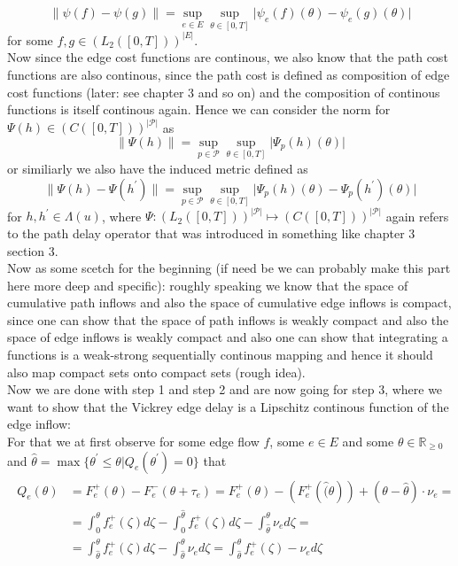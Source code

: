 \documentclass[reqno,openany]{amsbook}
\theoremstyle{definition}
\theoremstyle{plain}
\begin{document}
\[ \lVert \psi(f) - \psi(g) \rVert = \sup_{e \in E} \sup_{\theta \in [0, T]} \lvert \psi_e(f)(\theta) - \psi_e(g)(\theta) \rvert \]
for some $f, g \in (L_2([0,T]))^{\lvert E \rvert}$. \\
Now since the edge cost functions are continous, we also know that the path cost functions are also continous, since the path cost is defined as composition of edge cost functions (later: see chapter 3 and so on) and the composition of continous functions is itself continous again. Hence we can consider the norm for $\Psi(h) \in (C([0, T]))^{\lvert \mathcal{P} \rvert}$ as
\[ \lVert \Psi(h) \rVert = \sup_{p \in \mathcal{P}} \sup_{\theta \in [0, T]} \lvert \Psi_p(h)(\theta) \rvert \]
or similiarly we also have the induced metric defined as 
\[ \lVert \Psi(h) - \Psi(h^{\prime}) \rVert = \sup_{p \in \mathcal{P}} \sup_{\theta \in [0, T]} \lvert \Psi_p(h)(\theta) - \Psi_p(h^{\prime})(\theta) \rvert \]
for $h, h^{\prime} \in \Lambda(u)$, where $\Psi: (L_2([0, T]))^{\lvert \mathcal{P} \rvert} \mapsto (C([0, T]))^{\lvert \mathcal{P} \rvert}$ again refers to the path delay operator that was introduced in something like chapter 3 section 3.\\
Now as some scetch for the beginning (if need be we can probably make this part here more deep and specific): roughly speaking we know that the space of cumulative path inflows and also the space of cumulative edge inflows is compact, since one can show that the space of path inflows is weakly compact and also the space of edge inflows is weakly compact and also one can show that integrating a functions is a weak-strong sequentially continous mapping and hence it should also map compact sets onto compact sets (rough idea). \\
Now we are done with step 1 and step 2 and are now going for step 3, where we want to show that the Vickrey edge delay is a Lipschitz continous function of the edge inflow: \\
For that we at first observe for some edge flow $f$, some $e \in E$ and some $\theta \in \mathbb{R}_{\geq 0}$ and $\hat{\theta} = \max\{\theta^{\prime} \leq \theta \vert Q_e(\theta^{\prime}) = 0\}$ that
\begin{align}
	\begin{split}
		Q_e(\theta) &= F_e^+(\theta) - F_e^-(\theta + \tau_e) = F_e^+(\theta) - (F_e^+(\hat(\theta)) + (\theta - \hat{\theta})
		 \cdot \nu_e = \\
		 &= \int_0^{\theta} f_e^+(\zeta) d\zeta - \int_0^{\hat{\theta}} f_e^+(\zeta) d\zeta - \int_{\hat{\theta}}^{\theta} \nu_e
		 d\zeta = \\
		 &= \int_{\hat{\theta}}^{\theta} f_e^+(\zeta) d\zeta - \int_{\hat{\theta}}^{\theta} \nu_e d\zeta = 
		 \int_{\hat{\theta}}^{\theta} f_e^+(\zeta) - \nu_e d\zeta
	\end{split}
\end{align}
\end{document}
